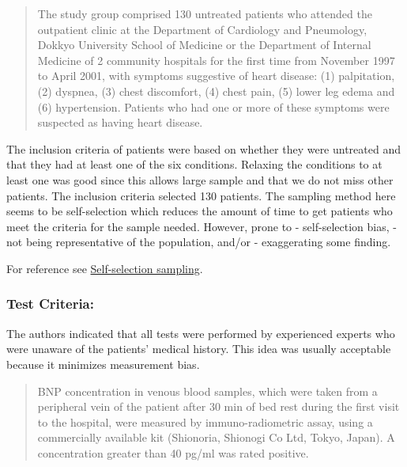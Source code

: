 \documentclass[11pt]{article}
\begin{document}
\begin{quote}
The study group comprised 130 untreated patients who attended the
outpatient clinic at the Department of Cardiology and Pneumology, Dokkyo
University School of Medicine or the Department of Internal Medicine of
2 community hospitals for the first time from November 1997 to April
2001, with symptoms suggestive of heart disease: (1) palpitation, (2)
dyspnea, (3) chest discomfort, (4) chest pain, (5) lower leg edema and
(6) hypertension. Patients who had one or more of these symptoms were
suspected as having heart disease.
\end{quote}

The inclusion criteria of patients were based on whether they were
untreated and that they had at least one of the six conditions. Relaxing
the conditions to at least one was good since this allows large sample
and that we do not miss other patients. The inclusion criteria selected
130 patients. The sampling method here seems to be self-selection which
reduces the amount of time to get patients who meet the criteria for the
sample needed. However, prone to - self-selection bias, - not being
representative of the population, and/or - exaggerating some finding.

For reference see
\href{http://dissertation.laerd.com/self-selection-sampling.php\#step2}{Self-selection
sampling}.

\hypertarget{test-criteria}{%
\subsubsection{\texorpdfstring{\textbf{Test
Criteria:}}{Test Criteria:}}\label{test-criteria}}

The authors indicated that all tests were performed by experienced
experts who were unaware of the patients' medical history. This idea was
usually acceptable because it minimizes measurement bias.

\begin{quote}
BNP concentration in venous blood samples, which were taken from a
peripheral vein of the patient after 30 min of bed rest during the first
visit to the hospital, were measured by immuno-radiometric assay, using
a commercially available kit (Shionoria, Shionogi Co Ltd, Tokyo, Japan).
A concentration greater than 40 pg/ml was rated positive.
\end{quote}
\end{document}
